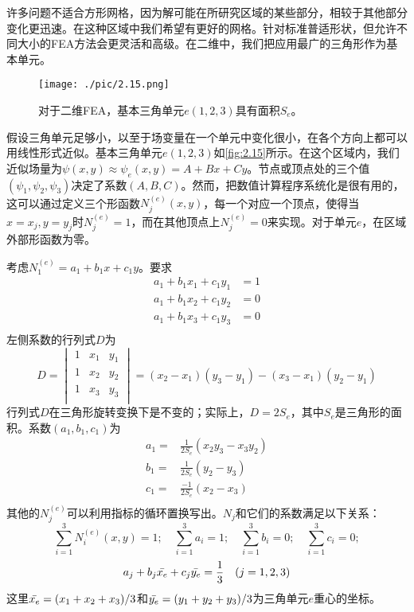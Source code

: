 \documentclass[12pt]{book}
\numberwithin{equation}{chapter}
\numberwithin{figure}{chapter}
\numberwithin{footnote}{page}
\begin{document}
许多问题不适合方形网格，因为解可能在所研究区域的某些部分，相较于其他部分变化更迅速。在这种区域中我们希望有更好的网格。针对标准普适形状，但允许不同大小的FEA方法会更灵活和高级。在二维中，我们把应用最广的三角形作为基本单元。

\begin{figure}[!ht]
    \centering
    \texttt{[image: ./pic/2.15.png]}
    \captionsetup{justification=raggedright, singlelinecheck=false}
    \caption{对于二维FEA，基本三角单元$e(1,2,3)$具有面积$S_e$。}
    \label{fig:2.15}
\end{figure}

假设三角单元足够小，以至于场变量在一个单元中变化很小，在各个方向上都可以用线性形式近似。基本三角单元$e(1,2,3)$如\autoref{fig:2.15}所示。在这个区域内，我们近似场量为$\psi(x,y)\approx\psi_e(x,y)=A+Bx+Cy$。节点或顶点处的三个值$(\psi_1,\psi_2,\psi_3)$决定了系数$(A,B,C)$。然而，把数值计算程序系统化是很有用的，这可以通过定义三个形函数$N_j^{(e)}(x,y)$，每一个对应一个顶点，使得当$x=x_j,y=y_j$时$N_j^{(e)}=1$，而在其他顶点上$N_j^{(e)}=0$来实现。对于单元$e$，在区域外部形函数为零。

\small{考虑$N_1^{(e)}=a_1+b_1x+c_1y$。要求
$$\begin{aligned}
    a_1+b_1x_1+c_1y_1&=1\\
    a_1+b_1x_2+c_1y_2&=0\\
    a_1+b_1x_3+c_1y_3&=0\\
\end{aligned}$$
左侧系数的行列式$D$为
$$D=\begin{vmatrix}
    1 & x_1 & y_1\\
    1 & x_2 & y_2\\
    1 & x_3 & y_3\\
\end{vmatrix}=(x_2-x_1)(y_3-y_1)-(x_3-x_1)(y_2-y_1)$$
行列式$D$在三角形旋转变换下是不变的；实际上，$D=2S_e$，其中$S_e$是三角形的面积。系数$(a_1,b_1,c_1)$为
$$\begin{aligned}
    a_1=&\frac{1}{2S_e}(x_2y_3-x_3y_2)\\
    b_1=&\frac{1}{2S_e}(y_2-y_3)\\
    c_1=&\frac{-1}{2S_e}(x_2-x_3)\\
\end{aligned}$$
其他的$N_j^{(e)}$可以利用指标的循环置换写出。$N_j$和它们的系数满足以下关系：
$$\sum_{i=1}^3 N_i^{(e)}(x,y)=1;\quad \sum_{i=1}^3 a_i=1;\quad \sum_{i=1}^3 b_i=0;\quad \sum_{i=1}^3 c_i=0;$$
$$a_j+b_j\Bar{x_e}+c_j\Bar{y_e}=\frac{1}{3}\quad (j=1,2,3)$$
这里$\Bar{x_e}=(x_1+x_2+x_3)/3$和$\Bar{y_e}=(y_1+y_2+y_3)/3$为三角单元$e$重心的坐标。}
\end{document}
